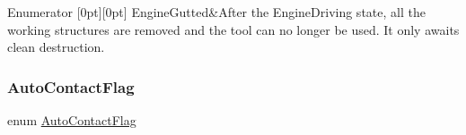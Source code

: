 \begin{DoxyEnumFields}{Enumerator}
[0pt][0pt]{}\mbox{\label{namespaceKatabatic_ab9e409db5feff0bdbc85e90e2a029cdaafb5f961d4cad2bb9fbda71204061c877}} 
Engine\+Gutted&After the Engine\+Driving state, all the working structures are removed and the tool can no longer be used. It only awaits clean destruction. \\
\hline

\end{DoxyEnumFields}
\mbox{\label{namespaceKatabatic_a4950b7142b9024cae2693cd44bccdc24}} 
\subsubsection{\texorpdfstring{Auto\+Contact\+Flag}{AutoContactFlag}}
{\footnotesize\ttfamily enum \hyperlink{namespaceKatabatic_a4950b7142b9024cae2693cd44bccdc24}{Auto\+Contact\+Flag}}

